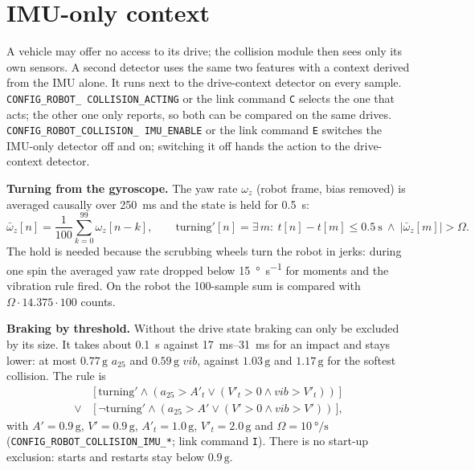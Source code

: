 \documentclass[11pt,a4paper]{article}
\newcommand{\g}{\,\mathrm{g}}
\newcommand{\code}[1]{\texttt{#1}}
\newcommand{\azf}{a_{25}}
\newcommand{\vib}{\mathit{vib}}
\begin{document}
\section{IMU-only context}
\label{sec:imu}

A vehicle may offer no access to its drive; the collision module then sees only its own
sensors. A second detector uses the same two features with a context derived from the IMU
alone. It runs next to the drive-context detector on every sample. \code{CONFIG\_ROBOT\_%
COLLISION\_ACTING} or the link command \code{C} selects the one that acts; the other one only
reports, so both can be compared on the same drives. \code{CONFIG\_ROBOT\_COLLISION\_%
IMU\_ENABLE} or the link command \code{E} switches the IMU-only detector off and on; switching it
off hands the action to the drive-context detector.

\textbf{Turning from the gyroscope.} The yaw rate $\omega_z$ (robot frame, bias removed) is
averaged causally over \SI{250}{\milli\second} and the state is held for
\SI{0.5}{\second}:
\begin{equation}
  \bar\omega_z[n] = \frac{1}{100} \sum_{k=0}^{99} \omega_z[n-k], \qquad
  \text{turning}'[n] = \exists\, m:\ t[n]-t[m] \le \SI{0.5}{\second} \ \land\
  |\bar\omega_z[m]| > \Omega .
\end{equation}
The hold is needed because the scrubbing wheels turn the robot in jerks: during one spin the
averaged yaw rate dropped below \SI{15}{\degree\per\second} for moments and the vibration rule
fired. On the robot the 100-sample sum is compared with $\Omega \cdot 14.375 \cdot 100$ counts.

\textbf{Braking by threshold.} Without the drive state braking can only be excluded by its
size. It takes about \SI{0.1}{\second} against \SIrange{17}{31}{\milli\second} for an
impact and stays lower: at most $0.77\g$ $\azf$ and $0.59\g$ $\vib$, against $1.03\g$ and
$1.17\g$ for the softest collision. The rule is
\begin{equation}
  \begin{aligned}
    &\big[\,\text{turning}' \land (\azf > A'_t \lor (V'_t > 0 \land \vib > V'_t))\,\big] \\
    \lor\ &\big[\,\lnot\text{turning}' \land (\azf > A' \lor (V' > 0 \land \vib > V'))\,\big],
  \end{aligned}
\end{equation}
with $A' = 0.9\g$, $V' = 0.9\g$, $A'_t = 1.0\g$, $V'_t = 2.0\g$ and
$\Omega = \SI{10}{\degree\per\second}$
(\code{CONFIG\_ROBOT\_COLLISION\_}\allowbreak\code{IMU\_*}; link command \code{I}). There is no start-up
exclusion: starts and restarts stay below $0.9\g$.
\end{document}
